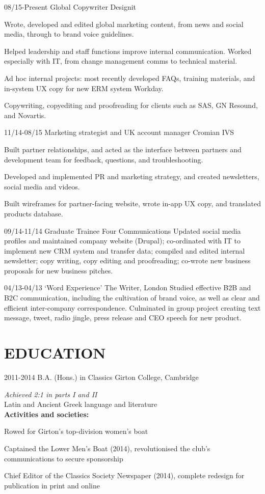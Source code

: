 \documentclass[]{friggeri-cv}
\begin{document}
\begin{entrylist}
	\entry
	{08/15-Present}
	{Global Copywriter}
	{Designit}
	{
		Wrote, developed and edited global marketing content, from news and social media, through to brand voice guidelines.

		Helped leadership and staff functions improve internal communication. Worked especially with IT, from change management comms to technical material.

		Ad hoc internal projects: most recently developed FAQs, training materials, and in-system UX copy for new ERM system Workday.

		Copywriting, copyediting and proofreading for clients such as SAS, GN Resound, and Novartis.
	}
	\entry
	{11/14-08/15}
	{Marketing strategist and UK account manager}
	{Cromian IVS}
	{
		Built partner relationships, and acted as the interface between partners and development team for feedback, questions, and troubleshooting.

		Developed and implemented PR and marketing strategy, and created newsletters, social media and videos.

		Built wireframes for partner-facing website, wrote in-app UX copy, and translated products database.
	}
	\entry
	{09/14-11/14}
	{Graduate Trainee}
	{Four Communications}
	{
		Updated social media profiles and maintained company website (Drupal); co-ordinated with IT to implement new CRM system and transfer data; compiled and edited internal newsletter; copy writing, copy editing and proofreading; co-wrote new business proposals for new business pitches.
	}
\end{entrylist}
\begin{entrylist}
	\entry
	{04/13-04/13}
	{‘Word Experience’}
	{The Writer, London}
	{
		Studied effective B2B and B2C communication, including the cultivation of brand voice, as well as clear and efficient inter-company correspondence. Culminated in group project creating text message, tweet, radio jingle, press release and CEO speech for new product.
	}
\end{entrylist}

\pagebreak

\section{EDUCATION}

\begin{entrylist}
	\entry
	{2011-2014}
	{B.A. (Hons.) in Classics}
	{Girton College, Cambridge}
	{
		\emph{Achieved 2:1 in parts I and II}
		\\

		Latin and Ancient Greek language and literature
		\\

		\textbf{Activities and societies:}

		Rowed for Girton's top-division women's boat

		Captained the Lower Men's Boat (2014), revolutionised the club's communications to secure sponsorship

		Chief Editor of the Classics Society Newspaper (2014), complete redesign for publication in print and online
	}
\end{entrylist}
\end{document}
